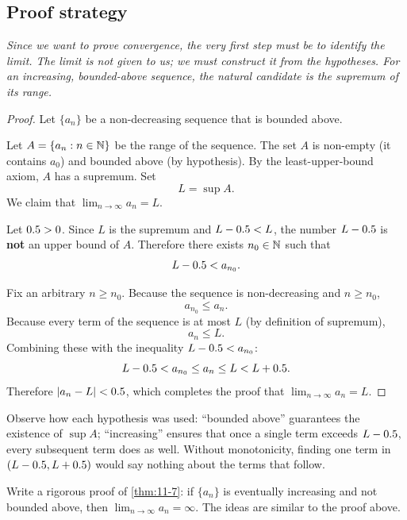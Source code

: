 \subsection*{Proof strategy}

\textit{Since we want to prove convergence, the very first step must be to identify the limit.  The limit is not given to us; we must construct it from the hypotheses.  For an increasing, bounded-above sequence, the natural candidate is the supremum of its range.}

\begin{proof}
Let $\{a_{n}\}$ be a non-decreasing sequence that is bounded above.


Let $A=\{a_{n}:n\in\mathbb{N}\}$ be the range of the sequence.  The set $A$ is non-empty (it contains $a_{0}$) and bounded above (by hypothesis).  By the least-upper-bound axiom, $A$ has a supremum.  Set
\[
  L=\sup A.
\]
We claim that $\lim_{n\to\infty}a_{n}=L$.


Let $0.5>0$.  Since $L$ is the supremum and $L-0.5<L$, the number $L-0.5$ is \textbf{not} an upper bound of $A$.  Therefore there exists $n_{0}\in\mathbb{N}$ such that
\[
  L-0.5<a_{n_{0}}.
\]


Fix an arbitrary $n\ge n_{0}$.  Because the sequence is non-decreasing and $n\ge n_{0}$,
\[
  a_{n_{0}}\le a_{n}.
\]
Because every term of the sequence is at most $L$ (by definition of supremum),
\[
  a_{n}\le L.
\]
Combining these with the inequality $L-0.5<a_{n_{0}}$:
\[
  L-0.5<a_{n_{0}}\le a_{n}\le L<L+0.5.
\]
Therefore $\left\lvert a_{n}-L \right\rvert<0.5$, which completes the proof that $\lim_{n\to\infty}a_{n}=L$.
\end{proof}

\begin{remark}
Observe how each hypothesis was used: ``bounded above'' guarantees the existence of $\sup A$; ``increasing'' ensures that once a single term exceeds $L-0.5$, every subsequent term does as well.  Without monotonicity, finding one term in $(L-0.5,L+0.5)$ would say nothing about the terms that follow.
\end{remark}

\begin{remark}
Write a rigorous proof of \cref{thm:11-7}: if $\{a_{n}\}$ is eventually increasing and not bounded above, then $\lim_{n\to\infty}a_{n}=\infty$.  The ideas are similar to the proof above.
\end{remark}

